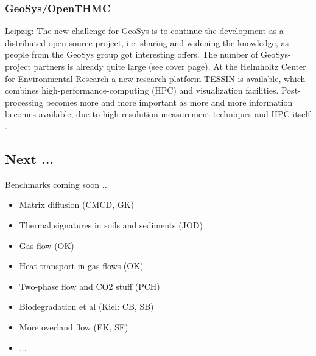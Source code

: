 \subsubsection*{GeoSys/OpenTHMC}

Leipzig:
The new challenge for GeoSys is to continue the development as a distributed open-source project, i.e. sharing and widening the knowledge, as people from the GeoSys group got interesting offers. The number of  GeoSys-project partners is already quite large (see cover page).
At the Helmholtz Center for Environmental Research a new research platform TESSIN is available, which combines high-performance-computing (HPC) and visualization facilities. Post-processing becomes more and more important as more and more information becomes available, due to high-resolution measurement techniques and HPC itself \cite{WanEtAl:2008}.

\subsection*{Next ...}

Benchmarks coming soon ...
\begin{itemize}
  \item Matrix diffusion (CMCD, GK)
  \item Thermal signatures in soils and sediments (JOD)
  \item Gas flow (OK)
  \item Heat transport in gas flows (OK)
  \item Two-phase flow and CO2 stuff (PCH)
  \item Biodegradation et al (Kiel: CB, SB)
  \item More overland flow (EK, SF)
  \item ...
\end{itemize}

